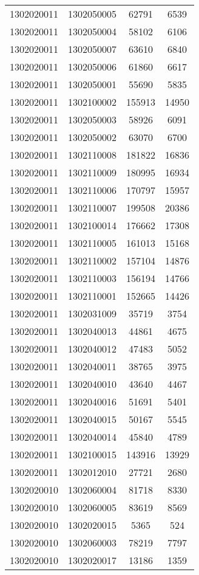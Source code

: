 \begin{longtable}{llcc}
1302020011 & 1302050005 & 62791 & 6539\\
1302020011 & 1302050004 & 58102 & 6106\\
1302020011 & 1302050007 & 63610 & 6840\\
1302020011 & 1302050006 & 61860 & 6617\\
1302020011 & 1302050001 & 55690 & 5835\\
1302020011 & 1302100002 & 155913 & 14950\\
1302020011 & 1302050003 & 58926 & 6091\\
1302020011 & 1302050002 & 63070 & 6700\\
1302020011 & 1302110008 & 181822 & 16836\\
1302020011 & 1302110009 & 180995 & 16934\\
1302020011 & 1302110006 & 170797 & 15957\\
1302020011 & 1302110007 & 199508 & 20386\\
1302020011 & 1302100014 & 176662 & 17308\\
1302020011 & 1302110005 & 161013 & 15168\\
1302020011 & 1302110002 & 157104 & 14876\\
1302020011 & 1302110003 & 156194 & 14766\\
1302020011 & 1302110001 & 152665 & 14426\\
1302020011 & 1302031009 & 35719 & 3754\\
1302020011 & 1302040013 & 44861 & 4675\\
1302020011 & 1302040012 & 47483 & 5052\\
1302020011 & 1302040011 & 38765 & 3975\\
1302020011 & 1302040010 & 43640 & 4467\\
1302020011 & 1302040016 & 51691 & 5401\\
1302020011 & 1302040015 & 50167 & 5545\\
1302020011 & 1302040014 & 45840 & 4789\\
1302020011 & 1302100015 & 143916 & 13929\\
1302020011 & 1302012010 & 27721 & 2680\\
1302020010 & 1302060004 & 81718 & 8330\\
1302020010 & 1302060005 & 83619 & 8569\\
1302020010 & 1302020015 & 5365 & 524\\
1302020010 & 1302060003 & 78219 & 7797\\
1302020010 & 1302020017 & 13186 & 1359\\

\end{longtable}
